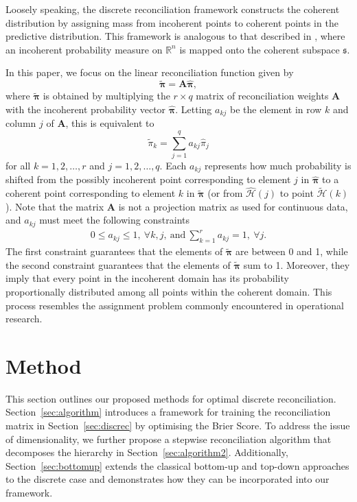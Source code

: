 \documentclass[a4paper,review,11pt,authoryear]{elsarticle}
\newcommand{\bpi}{\bm{\pi}}
\theoremstyle{definition}
\begin{document}
   Loosely speaking, the discrete reconciliation framework constructs the coherent distribution by assigning mass from incoherent points to coherent points in the predictive distribution. This framework is analogous to that described in \cite{panagiotelisProbabilisticForecastReconciliation2022}, where an incoherent probability measure on $\mathbb{R}^n$ is mapped onto the coherent subspace $\mathfrak{s}$.

   In this paper, we focus on the linear reconciliation function given by
    \begin{equation}
	    \label{eq:framework}
	    \tilde{\bpi}=\bm{A}\hat{\bpi},
    \end{equation}
   where $\tilde{\bpi}$ is obtained by multiplying the $r \times q$ matrix of reconciliation weights $\bm{A}$ with the incoherent probability vector $\hat{\bpi}$. Letting $a_{kj}$ be the element in row $k$ and column $j$ of $\bm{A}$, this is equivalent to
    \[
      \tilde{\pi}_k=\sum\limits_{j=1}^q a_{kj}\hat{{\pi}}_j
    \]
    for all $k = 1, 2, \dots, r$  and  $j = 1, 2, \dots, q$.
   Each $a_{kj}$ represents how much probability is shifted from the possibly incoherent point corresponding to element $j$ in $\hat{\bpi}$ to a coherent point corresponding to element $k$ in $\tilde{\bpi}$ (or from $\hat{\mathcal{H}}(j)$ to point $\tilde{\mathcal{H}}(k)$). Note that the matrix $\mathbf{A}$ is not a projection matrix as used for continuous data, and $a_{kj}$ must meet the following constraints
   \begin{align*}
	 0\leq a_{kj} \leq 1 , ~ \forall k, j, ~ \textrm{and} ~
	\sum\limits_{k=1}^r a_{kj} = 1 , ~ \forall j.
    \end{align*}
    The first constraint guarantees that the elements of $\tilde{\bpi}$ are between 0 and 1, while the second constraint guarantees that the elements of $\tilde{\bpi}$ sum to 1. Moreover, they imply that every point in the incoherent domain has its probability proportionally distributed among all points within the coherent domain. This process resembles the assignment problem commonly encountered in operational research.

\section{Method}
\label{sec:method}

This section outlines our proposed methods for optimal discrete reconciliation. Section~\ref{sec:algorithm} introduces a framework for training the reconciliation matrix in Section~\ref{sec:discrec} by optimising the Brier Score. To address the issue of dimensionality, we further propose a stepwise reconciliation algorithm that decomposes the hierarchy in Section~\ref{sec:algorithm2}. Additionally, Section~\ref{sec:bottomup} extends the classical bottom-up and top-down approaches to the discrete case and demonstrates how they can be incorporated into our framework.
\end{document}

